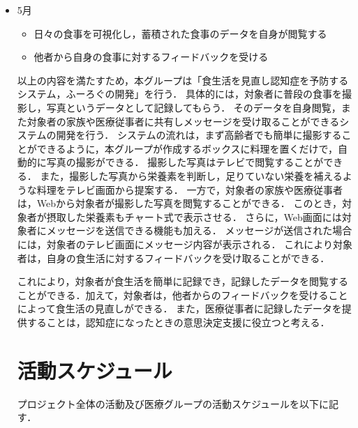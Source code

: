 \documentclass[../report]{subfiles}
\begin{document}
\begin{itemize}
    \item[] 5月
    \begin{itemize}
        \item 日々の食事を可視化し，蓄積された食事のデータを自身が閲覧する
        \item 他者から自身の食事に対するフィードバックを受ける
    \end{itemize}

以上の内容を満たすため，本グループは「食生活を見直し認知症を予防するシステム，ふーろぐの開発」を行う．
具体的には，対象者に普段の食事を撮影し，写真というデータとして記録してもらう．
そのデータを自身閲覧，また対象者の家族や医療従事者に共有しメッセージを受け取ることができるシステムの開発を行う．
システムの流れは，まず高齢者でも簡単に撮影することができるように，本グループが作成するボックスに料理を置くだけで，自動的に写真の撮影ができる．
撮影した写真はテレビで閲覧することができる．
また，撮影した写真から栄養素を判断し，足りていない栄養を補えるような料理をテレビ画面から提案する．
一方で，対象者の家族や医療従事者は，Webから対象者が撮影した写真を閲覧することができる．
このとき，対象者が摂取した栄養素もチャート式で表示させる．
さらに，Web画面には対象者にメッセージを送信できる機能も加える．
メッセージが送信された場合には，対象者のテレビ画面にメッセージ内容が表示される．
これにより対象者は，自身の食生活に対するフィードバックを受け取ることができる．

これにより，対象者が食生活を簡単に記録でき，記録したデータを閲覧することができる．加えて，対象者は，他者からのフィードバックを受けることによって食生活の見直しができる．
また，医療従事者に記録したデータを提供することは，認知症になったときの意思決定支援に役立つと考える．


\section{活動スケジュール}
プロジェクト全体の活動及び医療グループの活動スケジュールを以下に記す．


\end{itemize}
\end{document}
